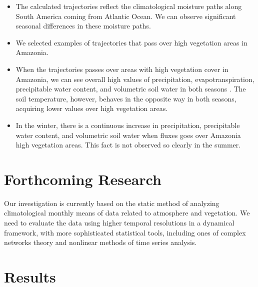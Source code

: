 \documentclass[a0, portrait]{a0poster}
\begin{document}
\begin{multicols}{2}
\begin{itemize}
\item The calculated trajectories reflect the climatological moisture paths
  along South America coming from Atlantic Ocean. We can observe significant
  seasonal differences in these moisture paths.
\item We selected examples of trajectories that pass over high vegetation areas
  in Amazonia.
\item When the trajectories passes over areas with high vegetation cover in
  Amazonia, we can see overall high values of precipitation, evapotranspiration,
  precipitable water content, and volumetric soil water in both seasons . The soil
  temperature, however, behaves in the opposite way in both seasons, acquiring
  lower values over high vegetation areas.
\item In the winter, there is a continuous increase in precipitation,
  precipitable water content, and volumetric soil water when fluxes goes over
  Amazonia high vegetation areas. This fact is not observed so clearly in the
  summer.
\end{itemize}

\section*{\centering Forthcoming Research}

Our investigation is currently based on the static method of analyzing
climatological monthly means of data related to atmosphere and vegetation. We
need to evaluate the data using higher temporal resolutions in a dynamical
framework, with more sophisticated statistical tools, including ones of complex
networks theory and nonlinear methods of time series analysis.

\section*{\centering Results}


\end{multicols}
\end{document}
